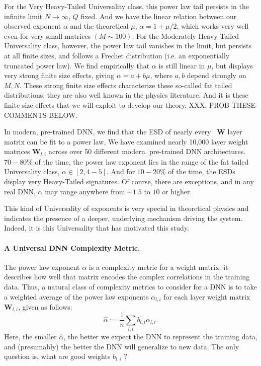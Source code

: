 For the Very Heavy-Tailed Universality class, this power law tail persists in the infinite limit $N\rightarrow\infty$, $Q$ fixed.
And we have the linear relation between our observed exponent $\alpha$ and the theoretical $\mu$,  $\alpha=1+\mu/2$, which works very well even for very small matrices $(M\sim100)$.
For the Moderately Heavy-Tailed Universality class, however, the power law tail vanishes in the limit, but persists at all finite sizes, and follows a Frechet distribution (i.e. an exponentially truncated power law). 
We find empirically that $\alpha$ is still linear in $\mu$, but displays very strong finite size effects, giving $\alpha=a+b\mu$, where $a,b$ depend strongly on $M,N$.
These strong finite size effects characterize these so-called fat tailed distributions; they are also well known in the physics literature\cite{SornetteBook,BouchaudPotters03}. 
And it is these finite size effects that we will exploit to develop our theory.
XXX.  PROB THESE COMMENTS BELOW.

In modern, pre-trained DNN, we find that the ESD of nearly every \ $\mathbf{W}$ layer matrix can be fit to a power law,
We have examined nearly 10,000 layer weight matrices $\mathbf{W}_{l,i}$ across over 50 different modern. pre-trained DNN architectures.  
 $70-80\%$ of the time, the power law exponent lies in the range of the fat tailed Universality class, $\alpha\in[2,4-5]$.
And for $10-20\%$ of the time, the ESDs display very Heavy-Tailed signatures.
Of course, there are exceptions, and in any real DNN,  $\alpha$ may range anywhere from $\sim1.5$ to $10$ or higher.  

This kind of Universality of exponents is very special in theoretical physics and indicates the presence of a deeper, 
underlying mechanism driving the system.  Indeed, it is this Universality that has motivated this study.


\paragraph{A Universal DNN Complexity Metric.} 

The power law exponent $\alpha$ is a complexity metric for a weight matrix; it describes how well that matrix encodes the complex correlations in the training data.
Thus, a natural class of complexity metrics to consider for a DNN is to take a weighted average of the power law exponents $\alpha_{l,i}$ for each layer weight matrix $\mathbf{W}_{l,i}$, given as follows:
\begin{equation}
\hat{\alpha}:=\dfrac{1}{n}\sum_{l,i}b_{l,i}\alpha_{l,i}  .
\label{eqn:alpha_hat_generic}
\end{equation}
Here, the smaller $\hat{\alpha}$, the better we expect the DNN to represent the training data, and (presumably) the better the DNN will generalize to new data.
The only question is, what are good weights $b_{l,i}$ ?

